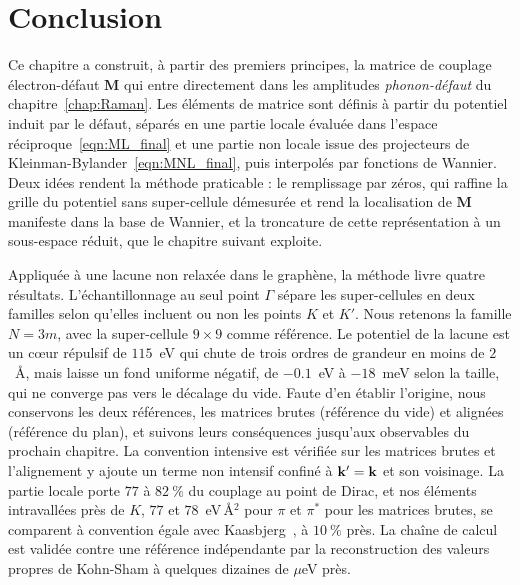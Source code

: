 \section{Conclusion}

Ce chapitre a construit, à partir des premiers principes, la matrice de couplage électron-défaut $\bm M$ qui entre directement dans les amplitudes \textit{phonon-défaut} du chapitre~\ref{chap:Raman}. Les éléments de matrice sont définis à partir du potentiel induit par le défaut, séparés en une partie locale évaluée dans l'espace réciproque~\eqref{eqn:ML_final} et une partie non locale issue des projecteurs de Kleinman-Bylander~\eqref{eqn:MNL_final}, puis interpolés par fonctions de Wannier. Deux idées rendent la méthode praticable : le remplissage par zéros, qui raffine la grille du potentiel sans super-cellule démesurée et rend la localisation de $\bm M$ manifeste dans la base de Wannier, et la troncature de cette représentation à un sous-espace réduit, que le chapitre suivant exploite.

Appliquée à une lacune non relaxée dans le graphène, la méthode livre quatre résultats. L'échantillonnage au seul point $\Gamma$ sépare les super-cellules en deux familles selon qu'elles incluent ou non les points $K$ et $K'$. Nous retenons la famille $N=3m$, avec la super-cellule $9\times 9$ comme référence. Le potentiel de la lacune est un c\oe ur répulsif de $115$~eV qui chute de trois ordres de grandeur en moins de $2$~\AA, mais laisse un fond uniforme négatif, de $-0.1$~eV à $-18$~meV selon la taille, qui ne converge pas vers le décalage du vide. Faute d'en établir l'origine, nous conservons les deux références, les matrices brutes (référence du vide) et alignées (référence du plan), et suivons leurs conséquences jusqu'aux observables du prochain chapitre. La convention intensive est vérifiée sur les matrices brutes et l'alignement y ajoute un terme non intensif confiné à $\mathbf{k}'=\mathbf{k}$ et son voisinage. La partie locale porte $77$ à $82~\%$ du couplage au point de Dirac, et nos éléments intravallées près de $K$, $77$ et $78$~eV\,\AA$^2$ pour $\pi$ et $\pi^*$ pour les matrices brutes, se comparent à convention égale avec Kaasbjerg~\cite{kaasbjergAtomisticMatrixTheory2020}, à $10~\%$ près. La chaîne de calcul est validée contre une référence indépendante par la reconstruction des valeurs propres de Kohn-Sham à quelques dizaines de $\mu$eV près.

